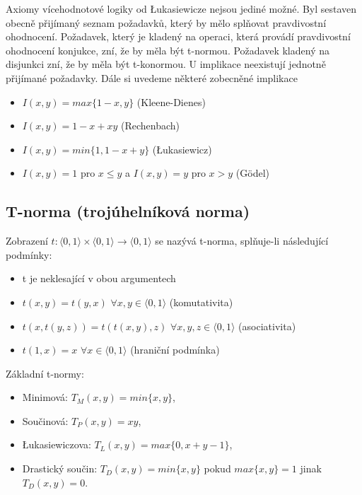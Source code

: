 Axiomy vícehodnotové logiky od Łukasiewicze nejsou jediné možné. Byl sestaven obecně přijímaný seznam požadavků, který by mělo splňovat pravdivostní ohodnocení. Požadavek, který je kladený na operaci, která provádí pravdivostní ohodnocení konjukce, zní, že by měla být t-normou. Požadavek kladený na disjunkci zní, že by měla být t-konormou. U implikace neexistují jednotně přijímané požadavky. Dále si uvedeme některé zobecněné implikace

\begin{itemize}
\item $I(x,y)=max\{1-x,y \}$ (Kleene-Dienes)
\item  $I(x,y)=1-x+xy$  (Rechenbach)
\item  $I(x,y)=min\{1,1-x+y\}$  (Łukasiewicz)
\item  $I(x,y)=1$ pro $x\leq y$ a $I(x,y)=y$ pro $x>y$  (Gödel)
\end{itemize}


\subsection{T-norma (trojúhelníková norma)}

\begin{definition}
Zobrazení $t:\langle 0,1\rangle \times \langle 0,1\rangle \rightarrow \langle 0,1\rangle$ se nazývá t-norma, splňuje-li následující podmínky:

\begin{itemize}
\item  t je neklesající v obou argumentech
\item  $t(x,y)=t(y,x)$  $\forall x,y\in \langle 0,1 \rangle$ (komutativita)
\item  $t(x,t(y,z))=t(t(x,y),z) $  $\forall x,y,z\in \langle 0,1 \rangle$ (asociativita)
\item $t(1,x)=x$  $\forall x\in \langle 0,1 \rangle$ (hraniční podmínka)
\end{itemize}
\end{definition}

Základní t-normy:
\begin{itemize}
\item Minimová: $T_M (x,y)=min\{x,y\}$,
\item Součinová: $T_P (x,y)=xy$,
\item Łukasiewiczova: $T_L (x,y)=max\{0,x+y-1\}$,
\item Drastický součin: $T_D(x,y)=min\{x,y\}$ pokud $max\{x,y\}=1$ jinak $T_D(x,y)=0$.
\end{itemize}



